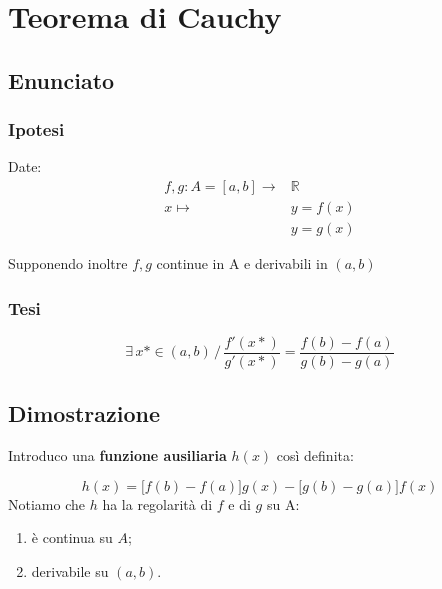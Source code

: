 \documentclass[../dimostrazioni]{subfiles}
\begin{document}
    \chapter{Teorema di Cauchy}
    \label{teoCauchy}

        \section*{Enunciato}

            \subsection*{Ipotesi}

                Date:
                \begin{align*}
                    f,g : A = [a, b] \longrightarrow &\mathbb{R}\\
                    x \longmapsto &y = f(x)\\
                                  &y = g(x) 
                \end{align*}

                Supponendo inoltre \(f, g\) continue in A e derivabili in \( (a,b) \)

            \subsection*{Tesi}

                \[ 
                    \exists \, x* \in (a,b) \, / \, \frac{ f'(x*) }{ g'(x*) } = \frac{ f(b) - f(a) }{ g(b) - g(a) }
                \]

        \section*{Dimostrazione}

            Introduco una \textbf{funzione ausiliaria} \(h(x)\) così definita:

            \[ 
                h(x) = \big[f(b) - f(a)\big]g(x) - \big[g(b) - g(a)\big]f(x)
            \]
            Notiamo che \(h\) ha la regolarità di \(f\) e di \(g\) su A:
            \begin{enumerate}
                \indentitem \item è continua su \( A \);
                \indentitem \item derivabile su \( (a, b) \).
            \end{enumerate}
\end{document}
